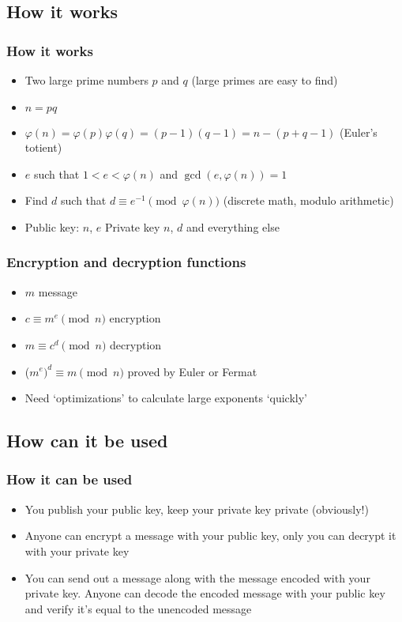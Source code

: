 \documentclass{beamer}
\begin{document}
\subsection{How it works}

\begin{frame}
	\frametitle{How it works}
	\begin{itemize}
		\item Two large prime numbers $p$ and $q$ (large primes are
                      easy to find)
		\item $n = pq$
		\item $\varphi(n) = \varphi(p)\varphi(q) = (p-1)(q-1) = n - (p + q -1)$
		      (Euler's totient)
		\item $e$ such that $1 < e < \varphi(n)$ and $\gcd(e, \varphi(n)) = 1$
		\item Find $d$ such that $d \equiv e^{-1} \pmod{\varphi(n)}$
		      (discrete math, modulo arithmetic)
		\item Public key: $n$, $e$ Private key $n$, $d$ and everything else
	\end{itemize}
\end{frame}

\begin{frame}
	\frametitle{Encryption and decryption functions}
	\begin{itemize}
		\item $m$ message
		\item $c \equiv m^e \pmod{n}$ encryption
		\item $m \equiv c^d \pmod{n}$ decryption
		\item ($m^e)^d \equiv m \pmod{n}$ proved by Euler or Fermat
		\item Need `optimizations' to calculate large exponents
		      `quickly'
	\end{itemize}
\end{frame}

\subsection{How can it be used}

\begin{frame}
	\frametitle{How it can be used}

	\begin{itemize}
		\item You publish your public key, keep your private key
		      private (obviously!)

		\item Anyone can encrypt a message with your public key,
		      only you can decrypt it with your private key

		\item You can send out a message along with the message
		      encoded with your private key. Anyone can decode the
		      encoded message with your public key and verify
		      it's equal to the unencoded message
	\end{itemize}
\end{frame}
\end{document}
